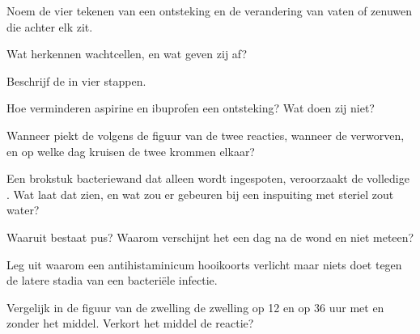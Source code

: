 \begin{exercise}[$\star$]\label{exo:g12:innate-immunity:2}
Noem de vier tekenen van een ontsteking en de verandering van vaten of
zenuwen die achter elk zit.
\end{exercise}

\begin{exercise}[$\star$]\label{exo:g12:innate-immunity:3}
Wat herkennen wachtcellen, en wat geven zij af?
\end{exercise}

\begin{exercise}[$\star$]\label{exo:g12:innate-immunity:4}
Beschrijf de  in vier stappen.
\end{exercise}

\begin{exercise}[$\star$]\label{exo:g12:innate-immunity:5}
Hoe verminderen aspirine en ibuprofen een ontsteking? Wat doen zij niet?
\end{exercise}

\begin{exercise}[$\star\star$]\label{exo:g12:innate-immunity:6}
Wanneer piekt de  volgens de figuur van de twee reacties,
wanneer de verworven, en op welke dag kruisen de twee krommen elkaar?
\end{exercise}

\begin{exercise}[$\star\star$]\label{exo:g12:innate-immunity:7}
Een brokstuk bacteriewand dat alleen wordt ingespoten, veroorzaakt de
volledige . Wat laat dat zien, en wat zou er gebeuren
bij een inspuiting met steriel zout water?
\end{exercise}

\begin{exercise}[$\star\star$]\label{exo:g12:innate-immunity:8}
Waaruit bestaat pus? Waarom verschijnt het een dag na de wond en niet
meteen?
\end{exercise}

\begin{exercise}[$\star\star$]\label{exo:g12:innate-immunity:9}
Leg uit waarom een antihistaminicum hooikoorts verlicht maar niets doet
tegen de latere stadia van een bacteriële infectie.
\end{exercise}

\begin{exercise}[$\star\star$]\label{exo:g12:innate-immunity:10}
Vergelijk in de figuur van de zwelling de zwelling op 12 en op 36 uur met
en zonder het middel. Verkort het middel de reactie?
\end{exercise}

